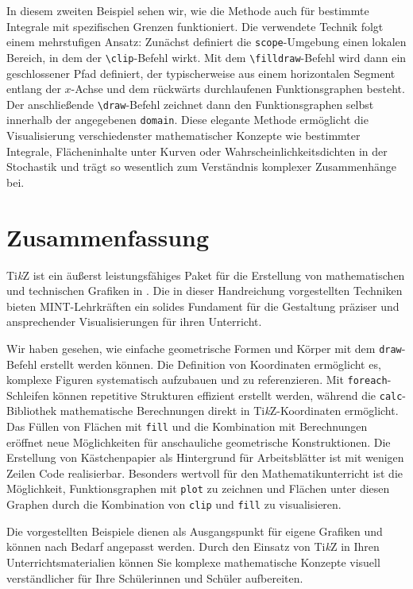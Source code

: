 In diesem zweiten Beispiel sehen wir, wie die Methode auch für bestimmte Integrale mit spezifischen Grenzen funktioniert. Die verwendete Technik folgt einem mehrstufigen Ansatz: Zunächst definiert die \texttt{scope}-Umgebung einen lokalen Bereich, in dem der \texttt{\textbackslash clip}-Befehl wirkt. Mit dem \texttt{\textbackslash filldraw}-Befehl wird dann ein geschlossener Pfad definiert, der typischerweise aus einem horizontalen Segment entlang der $x$-Achse und dem rückwärts durchlaufenen Funktionsgraphen besteht. Der anschließende \texttt{\textbackslash draw}-Befehl zeichnet dann den Funktionsgraphen selbst innerhalb der angegebenen \texttt{domain}. Diese elegante Methode ermöglicht die Visualisierung verschiedenster mathematischer Konzepte wie bestimmter Integrale, Flächeninhalte unter Kurven oder Wahrscheinlichkeitsdichten in der Stochastik und trägt so wesentlich zum Verständnis komplexer Zusammenhänge bei.


\section{Zusammenfassung}

Ti\textit{k}Z ist ein äußerst leistungsfähiges Paket für die Erstellung von mathematischen und technischen Grafiken in . Die in dieser Handreichung vorgestellten Techniken bieten MINT-Lehrkräften ein solides Fundament für die Gestaltung präziser und ansprechender Visualisierungen für ihren Unterricht.

Wir haben gesehen, wie einfache geometrische Formen und Körper mit dem \texttt{draw}-Befehl erstellt werden können. Die Definition von Koordinaten ermöglicht es, komplexe Figuren systematisch aufzubauen und zu referenzieren. Mit \texttt{foreach}-Schleifen können repetitive Strukturen effizient erstellt werden, während die \texttt{calc}-Bibliothek mathematische Berechnungen direkt in Ti\textit{k}Z-Koordinaten ermöglicht. Das Füllen von Flächen mit \texttt{fill} und die Kombination mit Berechnungen eröffnet neue Möglichkeiten für anschauliche geometrische Konstruktionen. Die Erstellung von Kästchenpapier als Hintergrund für Arbeitsblätter ist mit wenigen Zeilen Code realisierbar. Besonders wertvoll für den Mathematikunterricht ist die Möglichkeit, Funktionsgraphen mit \texttt{plot} zu zeichnen und Flächen unter diesen Graphen durch die Kombination von \texttt{clip} und \texttt{fill} zu visualisieren.

Die vorgestellten Beispiele dienen als Ausgangspunkt für eigene Grafiken und können nach Bedarf angepasst werden. Durch den Einsatz von Ti\textit{k}Z in Ihren Unterrichtsmaterialien können Sie komplexe mathematische Konzepte visuell verständlicher für Ihre Schülerinnen und Schüler aufbereiten.
